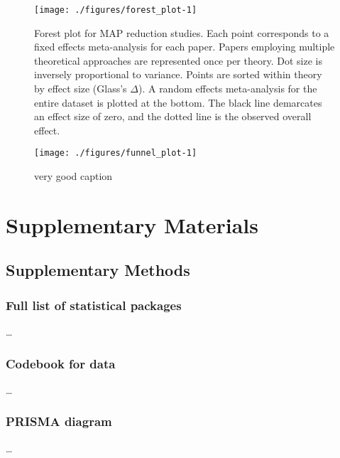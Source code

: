 \documentclass[sn-nature,referee,pdflatex]{sn-jnl}
\begin{document}
\begin{figure}[H]

{\centering \texttt{[image: ./figures/forest\_plot-1]} 

}

\caption{Forest plot for MAP reduction studies. Each point corresponds to a fixed effects meta-analysis for each paper. Papers employing multiple theoretical approaches are represented once per theory. Dot size is inversely proportional to variance. Points are sorted within theory by effect size (Glass's $\Delta$). A random effects meta-analysis for the entire dataset is plotted at the bottom. The black line demarcates an effect size of zero, and the dotted line is the observed overall effect.}\label{fig:forest_plot}
\end{figure}

\begin{figure}
\texttt{[image: ./figures/funnel\_plot-1]} \caption{very good caption }\label{fig:funnel_plot}
\end{figure}

\newpage

\section{Supplementary Materials}\label{Sec5}

\subsection{Supplementary Methods}\label{Sec5.1}

\subsubsection{Full list of statistical
packages}\label{full-list-of-statistical-packages}

\ldots{}

\subsubsection{Codebook for data}\label{codebook-for-data}

\ldots{}

\subsubsection{PRISMA diagram}\label{prisma-diagram}

\ldots{}
\end{document}
